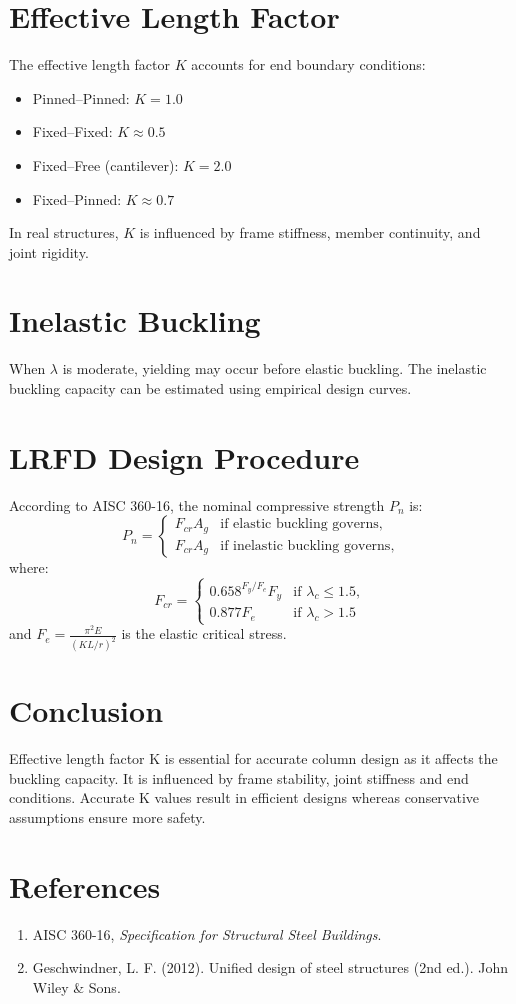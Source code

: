 \documentclass[12pt,a4paper]{article}
\begin{document}
\section{Effective Length Factor}
The effective length factor $K$ accounts for end boundary conditions:
\begin{itemize}
    \item Pinned–Pinned: $K = 1.0$
    \item Fixed–Fixed: $K \approx 0.5$
    \item Fixed–Free (cantilever): $K = 2.0$
    \item Fixed–Pinned: $K \approx 0.7$
\end{itemize}
In real structures, $K$ is influenced by frame stiffness, member continuity, and joint rigidity.

\section{Inelastic Buckling}
When $\lambda$ is moderate, yielding may occur before elastic buckling. The inelastic buckling capacity can be estimated using empirical design curves.

\section{LRFD Design Procedure}
According to AISC 360-16, the nominal compressive strength $P_n$ is:
\begin{equation}
    P_n =
    \begin{cases}
        F_{cr} A_g & \text{if elastic buckling governs}, \\
        F_{cr} A_g & \text{if inelastic buckling governs},
    \end{cases}
\end{equation}
where:
\[
F_{cr} = 
\begin{cases}
0.658^{F_y / F_e} F_y & \text{if } \lambda_c \leq 1.5, \\
0.877 F_e & \text{if } \lambda_c > 1.5
\end{cases}
\]
and $F_e = \frac{\pi^2 E}{(K L / r)^2}$ is the elastic critical stress.

\section{Conclusion}
Effective length factor K is essential for accurate column design as it affects the buckling capacity. It is influenced by frame stability, joint stiffness and end conditions. Accurate K values result in efficient designs whereas conservative assumptions ensure more safety.
\section*{References}
\begin{enumerate}
    \item AISC 360-16, \textit{Specification for Structural Steel Buildings}.
    \item Geschwindner, L. F. (2012). Unified design of steel structures (2nd ed.). John Wiley & Sons.
    
\end{enumerate}
\end{document}
